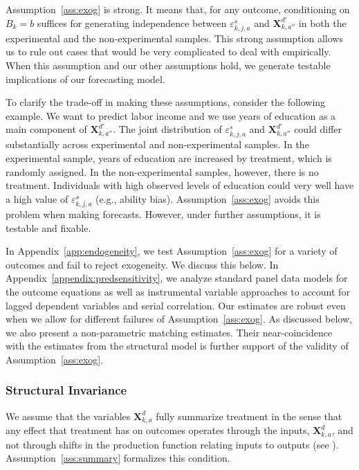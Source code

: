 Assumption~\ref{ass:exog} is strong. It means that, for any outcome, conditioning on $B_{k} = b$ suffices for generating independence between $\varepsilon_{k,j,a}^s$ and $\bm{X}_{k,{a''}}^{d'}$ in both the experimental and the non-experimental samples. This strong assumption allows us to rule out cases that would be very complicated to deal with empirically. When this assumption and our other assumptions hold, we generate testable implications of our forecasting model.

To clarify the trade-off in making these assumptions, consider the following example. We want to predict labor income and we use years of education as a main component of $\bm{X}_{k,{a''}}^{d'}$. The joint distribution of $\varepsilon_{k,j,a}^s$ and $\bm{X}_{k,{a''}}^{d'}$ could differ substantially across experimental and non-experimental samples. In the experimental sample, years of education are increased by treatment, which is randomly assigned. In the non-experimental samples, however, there is no treatment. Individuals with high observed levels of education could very well have a high value of  $\varepsilon_{k,j,a}^s$ (e.g., ability bias). Assumption~\ref{ass:exog} avoids this problem when making forecasts. However, under further assumptions, it is testable and fixable.

In Appendix~\ref{app:endogeneity}, we test Assumption~\ref{ass:exog} for a variety of outcomes and fail to reject exogeneity. We discuss this below. In Appendix~\ref{appendix:predsensitivity}, we analyze standard panel data models for the outcome equations as well as instrumental variable approaches to account for lagged dependent variables and serial correlation. Our estimates are robust even when we allow for different failures of Assumption~\ref{ass:exog}. As discussed below, we also present a non-parametric matching estimates. Their near-coincidence with the estimates from the structural model is further support of the validity of Assumption~\ref{ass:exog}.

\subsubsection{Structural Invariance}

We assume that the variables $\bm{X}_{k,a}^d$ fully summarize treatment in the sense that any effect that treatment has on outcomes operates through the inputs, $\bm{X}_{k,a}^d$, and not through shifts in the production function relating inputs to outputs (see \citealp{Heckman_Pinto_etal_2013_PerryFactor}). Assumption~\ref{ass:summary} formalizes this condition.

